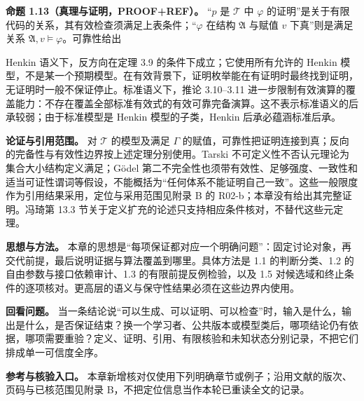 \documentclass[UTF8,a4paper,zihao=-4,fontset=windows,openany]{ctexbook}
\newcommand{\mcsdisplay}[1]{%
  \par\addvspace{0.7em}%
  \sbox{\mcsmathbox}{\ensuremath{\displaystyle #1}}%
  \ifdim\wd\mcsmathbox>\linewidth
    \noindent\resizebox{\linewidth}{!}{\usebox{\mcsmathbox}}%
  \else
    \noindent\hspace*{\fill}\usebox{\mcsmathbox}\hspace*{\fill}%
  \fi
  \par\addvspace{0.7em}%
}
\def\ensuremath#1{#1}%
\begin{document}
\textbf{命题 1.13（真理与证明，PROOF+REF）。} “\(p\) 是 \(\mathcal T\) 中 \(\varphi\) 的证明”是关于有限代码的关系，其有效检查须满足上表条件；“\(\varphi\) 在结构 \(\mathfrak A\) 与赋值 \(v\) 下真”则是满足关系 \(\mathfrak A,v\models\varphi\)。可靠性给出


\mcsdisplay{\Gamma\vdash_{\mathcal T}\varphi
\quad\Longrightarrow\quad
\mathcal T\cup\Gamma\models_{\mathcal K}\varphi.}
\noindent Henkin 语义下，反方向在定理 3.9 的条件下成立；它使用所有允许的 Henkin 模型，不是某一个预期模型。在有效背景下，证明枚举能在有证明时最终找到证明，无证明时一般不保证停止。标准语义下，推论 3.10–3.11 进一步限制有效演算的覆盖能力：不存在覆盖全部标准有效式的有效可靠完备演算。这不表示标准语义的后承较弱；由于标准模型是 Henkin 模型的子类，Henkin 后承必蕴涵标准后承。

\textbf{论证与引用范围。} 对 \(\mathcal T\) 的模型及满足 \(\Gamma\) 的赋值，可靠性把证明连接到真；反向的完备性与有效性边界按上述定理分别使用。Tarski 不可定义性不否认元理论为集合大小结构定义满足；Gödel 第二不完全性也须带有效性、足够强度、一致性和适当可证性谓词等假设，不能概括为“任何体系不能证明自己一致”。这些一般限度作为引用结果采用，定位与采用范围见附录 B 的 R02-b；本章没有给出其完整证明。冯琦第 13.3 节关于定义扩充的论述只支持相应条件核对，不替代这些元定理。

\textbf{思想与方法。} 本章的思想是“每项保证都对应一个明确问题”：固定讨论对象，再交代前提，最后说明证据与算法覆盖到哪里。具体方法是 1.1 的判断分类、1.2 的自由参数与接口依赖审计、1.3 的有限前提反例检验，以及 1.5 对候选域和终止条件的逐项核对。更高层的语义与保守性结果必须在这些边界内使用。

\textbf{回看问题。} 当一条结论说“可以生成、可以证明、可以检查”时，输入是什么，输出是什么，是否保证结束？换一个学习者、公共版本或模型类后，哪项结论仍有依据，哪项需要重验？定义、证明、引用、有限核验和未知状态分别记录，不把它们排成单一可信度全序。

\textbf{参考与核验入口。} 本章新增核对仅使用下列明确章节或例子；沿用文献的版次、页码与已核范围见附录 B，不把定位信息当作本轮已重读全文的记录。
\end{document}
